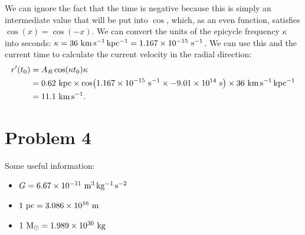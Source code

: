 \documentclass[11pt,letterpaper]{article}
\begin{document}
\begin{enumerate}[label=(\alph*)]
        We can ignore the fact that the time is negative because this is simply an intermediate value that will be put into $\cos$, which, as an even function, satisfies $\cos(x) = \cos(-x)$.
        We can convert the units of the epicycle frequency $\kappa$ into seconds: $\kappa = 36~{\rm km\,s^{-1}\,kpc^{-1}} = 1.167\times 10^{-15}~{\rm s^{-1}}$. We can use this and the current time to calculate the current velocity in the radial direction:
        \begin{align*}
            r'(t_0) &= A_R\cos(\kappa t_0)\kappa \\
            &= 0.62~{\rm kpc}\times \cos(1.167\times 10^{-15}~{\rm s^{-1}}\times -9.01\times 10^{14}~{\rm s})\times 36~{\rm km\,s^{-1}\,kpc^{-1}} \\
            &= 11.1~{\rm km\,s^{-1}}.
        \end{align*}

\end{enumerate}


\newpage
\section*{Problem 4}
Some useful information:
\begin{itemize}
    \item $G = 6.67\times 10^{-11}~{\rm m^3\,kg^{-1}\,s^{-2}}$
    \item $1~{\rm pc} = 3.086\times 10^{16}~{\rm m}$
    \item $1~{\rm M_\odot} = 1.989\times 10^{30}~{\rm kg}$
\end{itemize}
\end{document}
